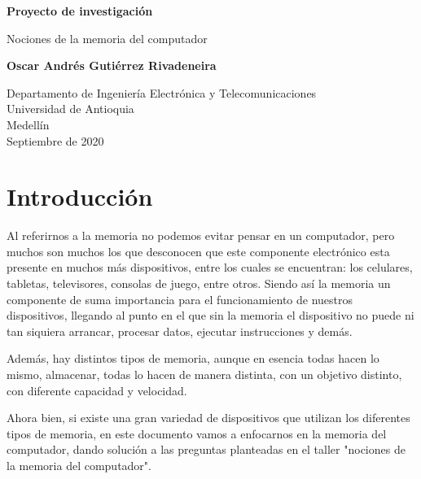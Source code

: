 \documentclass{article}
\begin{document}
\begin{titlepage}
    \begin{center}
        \vspace*{1cm}
            
        \Huge
        \textbf{Proyecto de investigación}
            
        \vspace{0.5cm}
        \LARGE
        Nociones de la memoria del computador
            
        \vspace{1.5cm}
            
        \textbf{Oscar Andrés Gutiérrez Rivadeneira}
            
        \vfill
            
        \vspace{0.8cm}
            
        \LARGE
        Departamento de Ingeniería Electrónica y Telecomunicaciones\\
        Universidad de Antioquia\\
        Medellín\\
        Septiembre de 2020
            
    \end{center}
\end{titlepage}

\tableofcontents

\newpage

\section{Introducción} 
Al referirnos a la memoria no podemos evitar pensar en un computador, pero muchos son muchos los que desconocen que este componente electrónico esta presente en muchos más dispositivos, entre los cuales se encuentran: los celulares, tabletas, televisores, consolas de juego, entre otros. Siendo así la memoria un componente de suma importancia para el funcionamiento de nuestros dispositivos, llegando al punto en el que sin la memoria el dispositivo no puede ni tan siquiera arrancar, procesar datos, ejecutar instrucciones y demás.\cite{tipos-memoria}

Además, hay distintos tipos de memoria, aunque en esencia todas hacen lo mismo, almacenar, todas lo hacen de manera distinta, con un objetivo distinto, con diferente capacidad y velocidad.\hfill
\vspace{4mm}

Ahora bien, si existe una gran variedad de dispositivos que utilizan los diferentes tipos de memoria, en este documento vamos a enfocarnos en la memoria del computador, dando solución a las preguntas planteadas en el taller "nociones de la memoria del computador".
\end{document}
